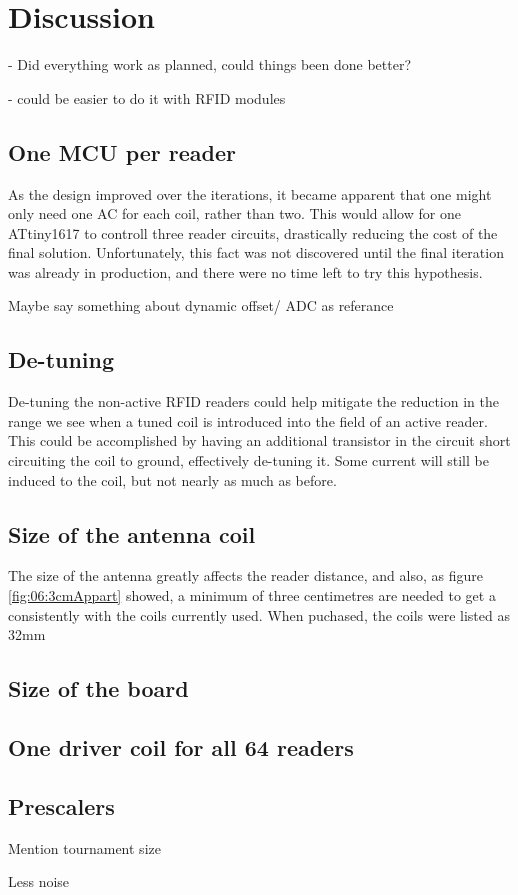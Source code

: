 \chapter{Discussion}

- Did everything work as planned, could things been done better? 

- could be easier to do it with RFID modules

\section{One MCU per reader}

As the design improved over the iterations, it became apparent that one might only need one AC for each coil, rather than two. This would allow for one ATtiny1617 to controll three reader circuits, drastically reducing the cost of the final solution. Unfortunately, this fact was not discovered until the final iteration was already in production, and there were no time left to try this hypothesis.

Maybe say something about dynamic offset/ ADC as referance

\section{De-tuning}

De-tuning the non-active RFID readers could help mitigate the reduction in the range we see when a tuned coil is introduced into the field of an active reader. This could be accomplished by having an additional transistor in the circuit short circuiting the coil to ground, effectively de-tuning it. Some current will still be induced to the coil, but not nearly as much as before.

\section{Size of the antenna coil}

The size of the antenna greatly affects the reader distance, and also, as figure \ref{fig:06:3cmAppart} showed, a minimum of three centimetres are needed to get a consistently with the coils currently used. When puchased, the coils were listed as 32mm

\section{Size of the board}

\section{One driver coil for all 64 readers}

\section{Prescalers}
Mention tournament size

Less noise